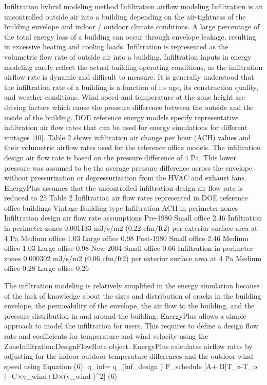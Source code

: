 	Infiltration hybrid modeling method
Infiltration airflow modeling
Infiltration is an uncontrolled outside air into a building depending on the air-tightness of the building envelope and indoor / outdoor climate conditions. A large percentage of the total energy loss of a building can occur through envelope leakage, resulting in excessive heating and cooling loads. Infiltration is represented as the volumetric flow rate of outside air into a building. Infiltration inputs in energy modeling rarely reflect the actual building operating conditions, as the infiltration airflow rate is dynamic and difficult to measure. It is generally understood that the infiltration rate of a building is a function of its age, its construction quality, and weather conditions. Wind speed and temperature at the zone height are driving factors which cause the pressure difference between the outside and the inside of the building. DOE reference energy models specify representative infiltration air flow rates that can be used for energy simulations for different vintages [40]. Table 2 shows infiltration air change per hour (ACH) values and their volumetric airflow rates used for the reference office models. The infiltration design air flow rate is based on the pressure difference of 4 Pa. This lower pressure was assumed to be the average pressure difference across the envelope without pressurization or depressurization from the HVAC and exhaust fans. EnergyPlus assumes that the uncontrolled infiltration design air flow rate is reduced to 25%
Table 2 Infiltration air flow rates represented in DOE reference office buildings
Vintage	Building type	Infiltration ACH in perimeter zones	Infiltration design air flow rate assumptions
Pre-1980	Small office	2.46	Infiltration in perimeter zones 0.001133 m3/s/m2 (0.22 cfm/ft2) per exterior surface area at 4 Pa
	Medium office	1.03	
	Large office	0.98	
Post-1980	Small office	2.46	
	Medium office	1.03	
	Large office	0.98	
New-2004	Small office	0.66	Infiltration in perimeter zones 0.000302 m3/s/m2 (0.06 cfm/ft2) per exterior surface area at 4 Pa
	Medium office	0.28	
	Large office	0.26	

The infiltration modeling is relatively simplified in the energy simulation because of the lack of knowledge about the sizes and distribution of cracks in the building envelope, the permeability of the envelope, the air flow to the building, and the pressure distribution in and around the building. EnergyPlus allows a simple approach to model the infiltration for users. This requires to define a design flow rate and coefficients for temperature and wind velocity using the ZoneInfiltration:DesignFlowRate object. EnergyPlus calculates airflow rates by adjusting for the indoor-outdoor temperature differences and the outdoor wind speed using Equation (6).
q_inf= q_(inf⁡_design ) F_schedule [A+ B|T_z-T_o |+C×v_wind+D×(v_wind )^2]	(6)


